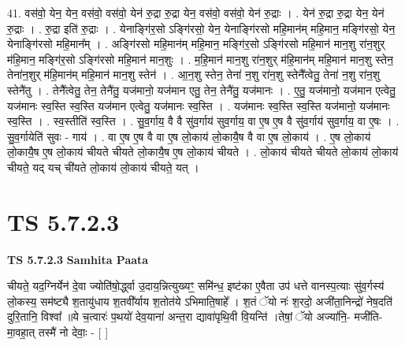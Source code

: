 \documentclass[17pt]{extarticle}
\begin{document}
41. वस॑वो॒ येन॒ येन॒ वस॑वो॒ वस॑वो॒ येन॑ रु॒द्रा रु॒द्रा येन॒ वस॑वो॒ वस॑वो॒ येन॑ रु॒द्राः । . येन॑ रु॒द्रा रु॒द्रा येन॒ येन॑ रु॒द्राः । . रु॒द्रा इति॑ रु॒द्राः । . येनाङ्गि॑र॒सो ऽङ्गि॑रसो॒ येन॒ येनाङ्गि॑रसो महि॒मान॑म् महि॒मान॒ मङ्गि॑रसो॒ येन॒ येनाङ्गि॑रसो महि॒मान᳚म् । . अङ्गि॑रसो महि॒मान॑म् महि॒मान॒ मङ्गि॑र॒सो ऽङ्गि॑रसो महि॒मान॑ मान॒शु रा॑न॒शुर् म॑हि॒मान॒ मङ्गि॑र॒सो ऽङ्गि॑रसो महि॒मान॑ मान॒शुः । . म॒हि॒मान॑ मान॒शु रा॑न॒शुर् म॑हि॒मान॑म् महि॒मान॑ मान॒शु स्तेन॒ तेना॑न॒शुर् म॑हि॒मान॑म् महि॒मान॑ मान॒शु स्तेन॑ । . आ॒न॒शु स्तेन॒ तेना॑ न॒शु रा॑न॒शु स्तेनै᳚त्वेतु॒ तेना॑ न॒शु रा॑न॒शु स्तेनै॑तु । . तेनै᳚त्वेतु॒ तेन॒ तेनै॑तु॒ यज॑मानो॒ यज॑मान एतु॒ तेन॒ तेनै॑तु॒ यज॑मानः । . ए॒तु॒ यज॑मानो॒ यज॑मान एत्वेतु॒ यज॑मानः स्व॒स्ति स्व॒स्ति यज॑मान एत्वेतु॒ यज॑मानः स्व॒स्ति । . यज॑मानः स्व॒स्ति स्व॒स्ति यज॑मानो॒ यज॑मानः स्व॒स्ति । . स्व॒स्तीति॑ स्व॒स्ति । . सु॒व॒र्गाय॒ वै वै सु॑व॒र्गाय॑ सुव॒र्गाय॒ वा ए॒ष ए॒ष वै सु॑व॒र्गाय॑ सुव॒र्गाय॒ वा ए॒षः । . सु॒व॒र्गायेति॑ सुवः - गाय॑ । . वा ए॒ष ए॒ष वै वा ए॒ष लो॒काय॑ लो॒कायै॒ष वै वा ए॒ष लो॒काय॑ । . ए॒ष लो॒काय॑ लो॒कायै॒ष ए॒ष लो॒काय॑ चीयते चीयते लो॒कायै॒ष ए॒ष लो॒काय॑ चीयते । . लो॒काय॑ चीयते चीयते लो॒काय॑ लो॒काय॑ चीयते॒ यद् यच् ची॑यते लो॒काय॑ लो॒काय॑ चीयते॒ यत् । \newline
\pagebreak
{}

\section{ TS 5.7.2.3 }

\textbf{TS 5.7.2.3 } \newline
\textbf{Samhita Paata} \newline

चीयते॒ यद॒ग्निर्येन॑ दे॒वा ज्योति॑षो॒र्द्ध्वा उ॒दाय॒न्नित्युख्यꣳ॒॒ समि॑न्ध॒  इष्ट॑का ए॒वैता उप॑ धत्ते वानस्प॒त्याः सु॑व॒र्गस्य॑ लो॒कस्य॒ सम॑ष्ट्यै श॒तायु॑धाय श॒तवी᳚र्याय श॒तोत॑ये ऽभिमाति॒षाहे᳚ । श॒तं ॅयो नः॑ श॒रदो॒ अजी॑ता॒निन्द्रो॑ नेष॒दति॑ दुरि॒तानि॒ विश्वा᳚ ॥ये च॒त्वारः॑ प॒थयो॑ देव॒याना॑ अन्त॒रा द्यावा॑पृथि॒वी वि॒यन्ति॑ ।तेषां॒ ॅयो अज्या॑नि॒- मजी॑ति-मा॒वहा॒त् तस्मै॑ नो देवाः॒ - [  ] \newline
\end{document}
